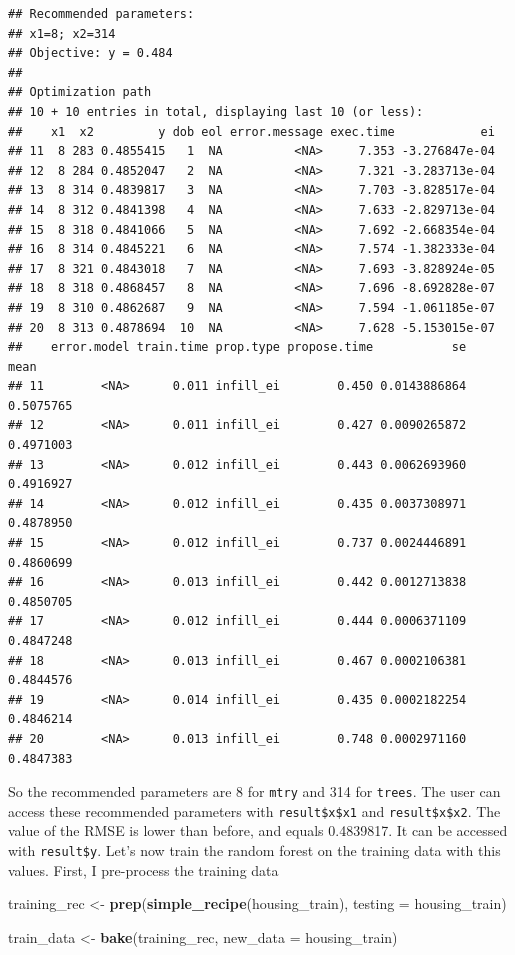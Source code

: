 \documentclass[]{gitbook}
\newenvironment{Shaded}{\begin{snugshade}}{\end{snugshade}}
\newcommand{\DataTypeTok}[1]{\textcolor[rgb]{0.13,0.29,0.53}{#1}}
\newcommand{\KeywordTok}[1]{\textcolor[rgb]{0.13,0.29,0.53}{\textbf{#1}}}
\newcommand{\NormalTok}[1]{#1}
\newcommand{\StringTok}[1]{\textcolor[rgb]{0.31,0.60,0.02}{#1}}
\theoremstyle{definition}
\theoremstyle{definition}
\theoremstyle{definition}
\theoremstyle{remark}
\begin{document}
\begin{verbatim}
## Recommended parameters:
## x1=8; x2=314
## Objective: y = 0.484
## 
## Optimization path
## 10 + 10 entries in total, displaying last 10 (or less):
##    x1  x2         y dob eol error.message exec.time            ei
## 11  8 283 0.4855415   1  NA          <NA>     7.353 -3.276847e-04
## 12  8 284 0.4852047   2  NA          <NA>     7.321 -3.283713e-04
## 13  8 314 0.4839817   3  NA          <NA>     7.703 -3.828517e-04
## 14  8 312 0.4841398   4  NA          <NA>     7.633 -2.829713e-04
## 15  8 318 0.4841066   5  NA          <NA>     7.692 -2.668354e-04
## 16  8 314 0.4845221   6  NA          <NA>     7.574 -1.382333e-04
## 17  8 321 0.4843018   7  NA          <NA>     7.693 -3.828924e-05
## 18  8 318 0.4868457   8  NA          <NA>     7.696 -8.692828e-07
## 19  8 310 0.4862687   9  NA          <NA>     7.594 -1.061185e-07
## 20  8 313 0.4878694  10  NA          <NA>     7.628 -5.153015e-07
##    error.model train.time prop.type propose.time           se      mean
## 11        <NA>      0.011 infill_ei        0.450 0.0143886864 0.5075765
## 12        <NA>      0.011 infill_ei        0.427 0.0090265872 0.4971003
## 13        <NA>      0.012 infill_ei        0.443 0.0062693960 0.4916927
## 14        <NA>      0.012 infill_ei        0.435 0.0037308971 0.4878950
## 15        <NA>      0.012 infill_ei        0.737 0.0024446891 0.4860699
## 16        <NA>      0.013 infill_ei        0.442 0.0012713838 0.4850705
## 17        <NA>      0.012 infill_ei        0.444 0.0006371109 0.4847248
## 18        <NA>      0.013 infill_ei        0.467 0.0002106381 0.4844576
## 19        <NA>      0.014 infill_ei        0.435 0.0002182254 0.4846214
## 20        <NA>      0.013 infill_ei        0.748 0.0002971160 0.4847383
\end{verbatim}

So the recommended parameters are 8 for \texttt{mtry} and 314 for
\texttt{trees}. The user can access these recommended parameters with
\texttt{result\$x\$x1} and \texttt{result\$x\$x2}. The value of the RMSE
is lower than before, and equals 0.4839817. It can be accessed with
\texttt{result\$y}. Let's now train the random forest on the training
data with this values. First, I pre-process the training data

\begin{Shaded}
\begin{Highlighting}[]
\NormalTok{training_rec <-}\StringTok{ }\KeywordTok{prep}\NormalTok{(}\KeywordTok{simple_recipe}\NormalTok{(housing_train), }\DataTypeTok{testing =}\NormalTok{ housing_train)}

\NormalTok{train_data <-}\StringTok{ }\KeywordTok{bake}\NormalTok{(training_rec, }\DataTypeTok{new_data =}\NormalTok{ housing_train)}
\end{Highlighting}
\end{Shaded}
\end{document}
